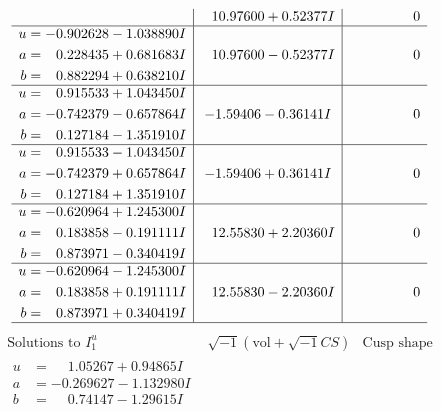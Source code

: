 \documentclass[1p]{elsarticle_modified}
\theoremstyle{definition}
\newcommand{\I}{\sqrt{-1}}
\begin{document}
$$\begin{array}{c|c|c}
 & \phantom{-}10.97600 + 0.52377 I & \phantom{-0.000000 } 0 \\ \hline\begin{aligned}
u &= -0.902628 - 1.038890 I \\
a &= \phantom{-}0.228435 + 0.681683 I \\
b &= \phantom{-}0.882294 + 0.638210 I\end{aligned}
 & \phantom{-}10.97600 - 0.52377 I & \phantom{-0.000000 } 0 \\ \hline\begin{aligned}
u &= \phantom{-}0.915533 + 1.043450 I \\
a &= -0.742379 - 0.657864 I \\
b &= \phantom{-}0.127184 - 1.351910 I\end{aligned}
 & -1.59406 - 0.36141 I & \phantom{-0.000000 } 0 \\ \hline\begin{aligned}
u &= \phantom{-}0.915533 - 1.043450 I \\
a &= -0.742379 + 0.657864 I \\
b &= \phantom{-}0.127184 + 1.351910 I\end{aligned}
 & -1.59406 + 0.36141 I & \phantom{-0.000000 } 0 \\ \hline\begin{aligned}
u &= -0.620964 + 1.245300 I \\
a &= \phantom{-}0.183858 - 0.191111 I \\
b &= \phantom{-}0.873971 - 0.340419 I\end{aligned}
 & \phantom{-}12.55830 + 2.20360 I & \phantom{-0.000000 } 0 \\ \hline\begin{aligned}
u &= -0.620964 - 1.245300 I \\
a &= \phantom{-}0.183858 + 0.191111 I \\
b &= \phantom{-}0.873971 + 0.340419 I\end{aligned}
 & \phantom{-}12.55830 - 2.20360 I & \phantom{-0.000000 } 0\\
 \hline 
 \end{array}$$\newpage$$\begin{array}{c|c|c}  
\text{Solutions to }I^u_{1}& \I (\text{vol} + \sqrt{-1}CS) & \text{Cusp shape}\\
 \hline 
\begin{aligned}
u &= \phantom{-}1.05267 + 0.94865 I \\
a &= -0.269627 - 1.132980 I \\
b &= \phantom{-}0.74147 - 1.29615 I\end{aligned}

\end{array}$$
\end{document}
